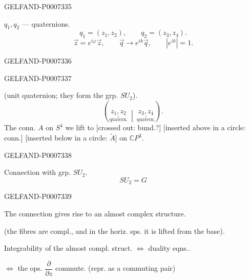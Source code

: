 \begin{GelfandAdjacentEvidence}{GELFAND-P000733}{5}


\(q_1,q_2\) --- quaternions.
\[
q_1=(z_1,z_2),\qquad q_2=(z_3,z_4).
\]
\[
\vec z=e^{i\varphi}\vec z,\qquad
\vec q\to e^{ik}\vec q,\qquad |e^{ik}|=1.
\]
\end{GelfandAdjacentEvidence}
\begin{GelfandAdjacentEvidence}{GELFAND-P000733}{6}

\end{GelfandAdjacentEvidence}
\begin{GelfandAdjacentEvidence}{GELFAND-P000733}{7}


(unit quaternion; they form the grp. \(SU_2\)).
\[
\left(\underset{\text{quatern.}}{\underline{z_1,z_2}}\ \middle|\
\underset{\text{quatern.}}{\underline{z_3,z_4}}\right).
\]
The conn. \(A\) on \(S^4\) we lift to [crossed out: bund.?]
[inserted above in a circle: conn.] [inserted below in a circle: \(\widetilde A\)] on \(\mathbb C P^3\).
\end{GelfandAdjacentEvidence}
\begin{GelfandAdjacentEvidence}{GELFAND-P000733}{8}


Connection with grp. \(SU_2\).
\[
SU_2=G
\]
\end{GelfandAdjacentEvidence}
\begin{GelfandAdjacentEvidence}{GELFAND-P000733}{9}


The connection gives rise to an almost complex structure.

(the fibres are compl., and in the horiz. sps. it is lifted from the base).


Integrability of the almost compl. struct. \(\Longleftrightarrow\) duality eqns..

\(\Longleftrightarrow\) the ops. \(\dfrac{\partial}{\partial z}\) commute.
(repr. as a commuting pair)

\end{GelfandAdjacentEvidence}
